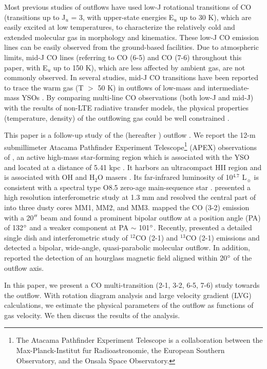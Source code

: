 Most previous studies of outflows have used low-J rotational transitions of CO (transitions up to J$_u$ = 3, with upper-state energies E$_u$ up to 30 K), which are easily excited at low temperatures, to characterize the relatively cold and extended molecular gas in morphology and kinematics. These low-J CO emission lines can be easily observed from the ground-based facilities. Due to atmospheric limits, mid-J CO lines (referring to CO (6-5) and CO (7-6) throughout this paper, with  E$_u$ up to 150 K), which are less affected by ambient gas, are not commonly observed. In several studies, mid-J CO transitions have been reported to trace the warm gas (T $>$ 50 K) in outflows of low-mass and intermediate-mass YSOs \citep{2009A&A...501..633V, 2009A&A...507.1425V, 2012A&A...542A..86Y, 2016A&A...587A..17V}.  By comparing multi-line CO observations (both low-J and mid-J) with the results of non-LTE radiative transfer models, the physical properties (temperature, density) of the outflowing gas could be well constrained \citep{2015A&A...581A...4L}. 

This paper is a follow-up study of the  (hereafter ) outflow \citep{2009ApJ...696...66Q}. We report the 12-m submillimeter Atacama Pathfinder Experiment Telescope\footnote{    The Atacama Pathfinder Experiment Telescope is a collaboration between the Max-Planck-Institut f$\ddot{\mathrm{u}}$r Radioastronomie, the European Southern Observatory, and the Onsala Space Observatory.} (APEX) observations of , an active high-mass star-forming region which is associated with the YSO  and located at a distance of 5.41 kpc \citep{2015PASJ...67...69S}. It harbors an ultracompact HII region and is associated with OH and H$_2$O masers \citep{1993AJ....105.1495H, 1997MNRAS.289..203C, 1998AJ....116.1897M, 1999ApJS..123..487M, 2003MNRAS.341..551C}. Its far-infrared luminosity of 10$^{4.7}$ L$_\sun$ is consistent with a spectral type O8.5 zero-age main-sequence star \citep{1998AJ....116.1897M}. \citet{2009ApJ...696...66Q} presented a high resolution interferometric study at 1.3 mm and resolved the central part of  into three dusty cores MM1, MM2, and MM3. \citet{2003A&A...412..175K} mapped the CO (3-2) emission with a 20${\mbox{$^{\prime\prime}$}}$ beam and found a prominent bipolar outflow at a position angle (PA) of 132${\mbox{$^\circ$}}$ and a weaker component at PA $\sim$ 101${\mbox{$^\circ$}}$. Recently, \citet{2009ApJ...696...66Q} presented a detailed single dish and interferometric study of $^{12}$CO (2-1) and $^{13}$CO (2-1) emissions and detected a bipolar, wide-angle, quasi-parabolic molecular outflow. In addition, \citet{2014ApJ...794L..18Q} reported the detection of an hourglass magnetic field aligned within 20${\mbox{$^\circ$}}$ of the outflow axis.

In this paper, we present a CO multi-transition (2-1, 3-2, 6-5, 7-6) study towards the  outflow. With rotation diagram analysis and large velocity gradient (LVG) calculations, we estimate the physical parameters of the outflow as functions of gas velocity. We then discuss the results of the analysis.


